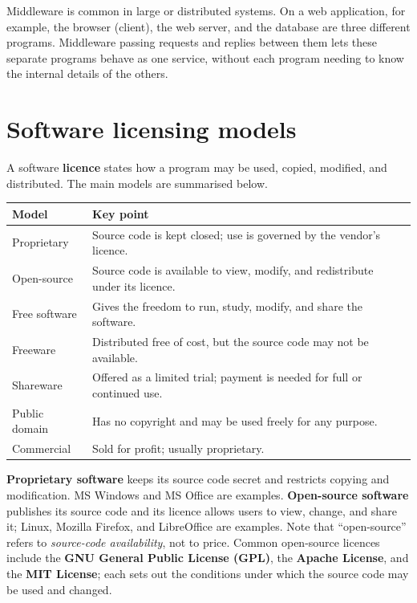 \documentclass[11pt]{article}
\begin{document}
Middleware is common in large or distributed systems. On a web application,
for example, the browser (client), the web server, and the database are three
different programs. Middleware passing requests and replies between them lets
these separate programs behave as one service, without each program needing to
know the internal details of the others.

\section{Software licensing models}
A software \textbf{licence} states how a program may be used, copied, modified,
and distributed. The main models are summarised below.

\begin{center}
\begin{tabular}{p{}p{}}
\toprule
\textbf{Model} & \textbf{Key point} \\
\midrule
Proprietary & Source code is kept closed; use is governed by the vendor's licence. \\
Open-source & Source code is available to view, modify, and redistribute under its licence. \\
Free software & Gives the freedom to run, study, modify, and share the software. \\
Freeware & Distributed free of cost, but the source code may not be available. \\
Shareware & Offered as a limited trial; payment is needed for full or continued use. \\
Public domain & Has no copyright and may be used freely for any purpose. \\
Commercial & Sold for profit; usually proprietary. \\
\bottomrule
\end{tabular}
\end{center}

\textbf{Proprietary software} keeps its source code secret and restricts
copying and modification. MS Windows and MS Office are examples.
\textbf{Open-source software} publishes its source code and its licence allows
users to view, change, and share it; Linux, Mozilla Firefox, and LibreOffice
are examples. Note that ``open-source'' refers to \emph{source-code
availability}, not to price. Common open-source licences include the
\textbf{GNU General Public License (GPL)}, the \textbf{Apache License}, and the
\textbf{MIT License}; each sets out the conditions under which the source code
may be used and changed.
\end{document}
